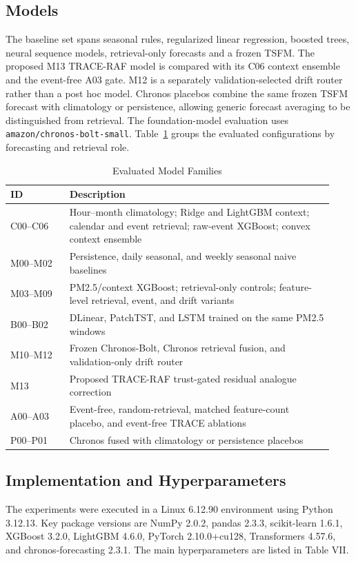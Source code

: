 \documentclass{ieeeaccess}
\begin{document}
\subsection{Models}
The baseline set spans seasonal rules, regularized linear regression, boosted trees, neural sequence models, retrieval-only forecasts and a frozen TSFM. The proposed M13 TRACE-RAF model is compared with its C06 context ensemble and the event-free A03 gate. M12 is a separately validation-selected drift router rather than a post hoc model. Chronos placebos combine the same frozen TSFM forecast with climatology or persistence, allowing generic forecast averaging to be distinguished from retrieval. The foundation-model evaluation uses \texttt{amazon/chronos-bolt-small}. Table~\ref{tab:model_families} groups the evaluated configurations by forecasting and retrieval role.

\begin{table}[!t]
\centering
\caption{Evaluated Model Families}
\label{tab:model_families}
\begin{tabular}{p{0.17\linewidth}p{0.76\linewidth}}
\toprule
ID & Description \\
\midrule
C00--C06 & Hour--month climatology; Ridge and LightGBM context; calendar and
event retrieval; raw-event XGBoost; convex context ensemble \\
M00--M02 & Persistence, daily seasonal, and weekly seasonal naive baselines \\
M03--M09 & PM2.5/context XGBoost; retrieval-only controls; feature-level
retrieval, event, and drift variants \\
B00--B02 & DLinear, PatchTST, and LSTM trained on the same PM2.5 windows \\
M10--M12 & Frozen Chronos-Bolt, Chronos retrieval fusion, and validation-only
drift router \\
M13 & Proposed TRACE-RAF trust-gated residual analogue correction \\
A00--A03 & Event-free, random-retrieval, matched feature-count placebo, and
event-free TRACE ablations \\
P00--P01 & Chronos fused with climatology or persistence placebos \\
\bottomrule
\end{tabular}
\end{table}

\subsection{Implementation and Hyperparameters}
The experiments were executed in a Linux 6.12.90 environment using Python 3.12.13. Key package versions are NumPy 2.0.2, pandas 2.3.3, scikit-learn 1.6.1, XGBoost 3.2.0, LightGBM 4.6.0, PyTorch 2.10.0+cu128, Transformers 4.57.6, and chronos-forecasting 2.3.1. The main hyperparameters are listed in Table VII.
\end{document}
